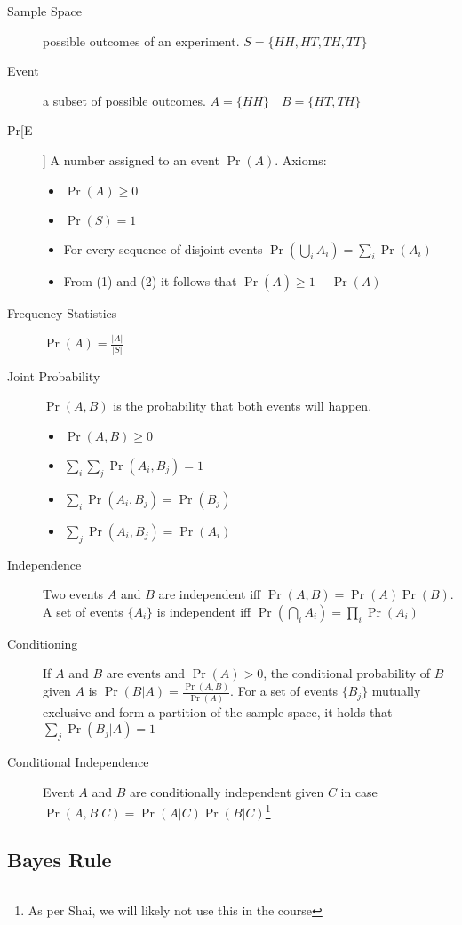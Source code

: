 \documentclass{idc_msc}
\begin{document}
\begin{description}
  \item[Sample Space] possible outcomes of an experiment. $S = \{HH, HT, TH, TT\}$
  \item[Event] a subset of possible outcomes. $A = \{HH\} \quad B = \{HT,TH\}$
  \item[Pr[E]] A number assigned to an event $\Pr(A)$. Axioms:
  \begin{itemize}
    \item $\Pr(A) \ge 0$
    \item $\Pr(S) = 1$
    \item For every sequence of disjoint events $\Pr(\bigcup_i A_i) = \sum_i \Pr(A_i)$
    \item From (1) and (2) it follows that $\Pr(\bar{A}) \ge 1 - \Pr(A)$
  \end{itemize}
  \item[Frequency Statistics] $\Pr(A) = \frac{|A|}{|S|}$
  \item[Joint Probability] $\Pr(A,B)$ is the probability that both events will happen.
  \begin{itemize}
    \item $\Pr(A,B) \ge 0$
    \item $\sum_i\sum_j \Pr(A_i, B_j) = 1$
    \item $\sum_i \Pr(A_i, B_j) = \Pr(B_j)$
    \item $\sum_j \Pr(A_i, B_j) = \Pr(A_i)$
  \end{itemize}
  \item[Independence] Two events $A$ and $B$ are independent iff $\Pr(A,B) = \Pr(A) \Pr(B)$.
  A set of events $\{A_i\}$ is independent iff $\Pr(\bigcap_i A_i) = \prod_i \Pr(A_i)$
  \item[Conditioning] If $A$ and $B$ are events and $\Pr(A) > 0$, the conditional probability of $B$ given $A$ is $\Pr(B|A)=\frac{\Pr(A,B)}{\Pr(A)}$.
  For a set of events $\{B_j\}$ mutually exclusive and form a partition of the sample space, it holds that $\sum_j \Pr(B_j|A) = 1$
  \item[Conditional Independence] Event $A$ and $B$ are conditionally independent given $C$ in case $\Pr(A,B|C) = \Pr(A|C) \Pr(B|C)$\footnote{As per Shai, we will likely not use this in the course}
\end{description}

\subsection{Bayes Rule}
\end{document}
